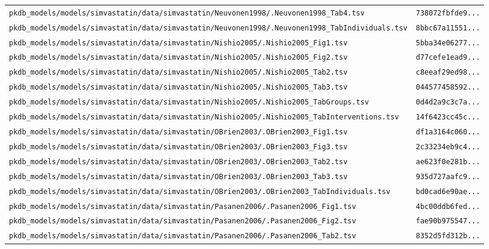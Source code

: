 \documentclass{article}
\begin{document}
\begin{longtable}{ll}
\texttt{pkdb\_models/models/simvastatin/data/simvastatin/Neuvonen1998/.Neuvonen1998\_Tab4.tsv} & \texttt{738072fbfde9...} \\
\texttt{pkdb\_models/models/simvastatin/data/simvastatin/Neuvonen1998/.Neuvonen1998\_TabIndividuals.tsv} & \texttt{8bbc67a11551...} \\
\texttt{pkdb\_models/models/simvastatin/data/simvastatin/Nishio2005/.Nishio2005\_Fig1.tsv} & \texttt{5bba34e06277...} \\
\texttt{pkdb\_models/models/simvastatin/data/simvastatin/Nishio2005/.Nishio2005\_Fig2.tsv} & \texttt{d77cefe1ead9...} \\
\texttt{pkdb\_models/models/simvastatin/data/simvastatin/Nishio2005/.Nishio2005\_Tab2.tsv} & \texttt{c8eeaf29ed98...} \\
\texttt{pkdb\_models/models/simvastatin/data/simvastatin/Nishio2005/.Nishio2005\_Tab3.tsv} & \texttt{044577458592...} \\
\texttt{pkdb\_models/models/simvastatin/data/simvastatin/Nishio2005/.Nishio2005\_TabGroups.tsv} & \texttt{0d4d2a9c3c7a...} \\
\texttt{pkdb\_models/models/simvastatin/data/simvastatin/Nishio2005/.Nishio2005\_TabInterventions.tsv} & \texttt{14f6423cc45c...} \\
\texttt{pkdb\_models/models/simvastatin/data/simvastatin/OBrien2003/.OBrien2003\_Fig1.tsv} & \texttt{df1a3164c060...} \\
\texttt{pkdb\_models/models/simvastatin/data/simvastatin/OBrien2003/.OBrien2003\_Fig3.tsv} & \texttt{2c33234eb9c4...} \\
\texttt{pkdb\_models/models/simvastatin/data/simvastatin/OBrien2003/.OBrien2003\_Tab2.tsv} & \texttt{ae623f0e281b...} \\
\texttt{pkdb\_models/models/simvastatin/data/simvastatin/OBrien2003/.OBrien2003\_Tab3.tsv} & \texttt{935d727aafc9...} \\
\texttt{pkdb\_models/models/simvastatin/data/simvastatin/OBrien2003/.OBrien2003\_TabIndividuals.tsv} & \texttt{bd0cad6e90ae...} \\
\texttt{pkdb\_models/models/simvastatin/data/simvastatin/Pasanen2006/.Pasanen2006\_Fig1.tsv} & \texttt{4bc00ddb6fed...} \\
\texttt{pkdb\_models/models/simvastatin/data/simvastatin/Pasanen2006/.Pasanen2006\_Fig2.tsv} & \texttt{fae90b975547...} \\
\texttt{pkdb\_models/models/simvastatin/data/simvastatin/Pasanen2006/.Pasanen2006\_Tab2.tsv} & \texttt{8352d5fd312b...} \\

\end{longtable}
\end{document}
